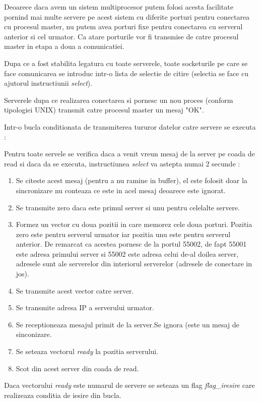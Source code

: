 Deoarece daca avem un sistem multiprocesor putem folosi acesta facilitate
pornind mai multe servere pe acest sistem cu diferite porturi pentru
conectarea cu procesul master, nu putem avea porturi fixe pentru conectarea
cu serverul anterior si cel urmator. Ca atare porturile vor fi transmise de
catre procesul master in etapa a doua a comunicatiei.

Dupa ce a fost stabilita legatura cu toate serverele, toate socketurile pe
care se face comunicarea se introduc intr-o lista de selectie de citire 
(selectia se face cu ajutorul instructiunii {\it select}).

Serverele dupa ce realizarea conectarea si pornesc un nou proces (conform
tipologiei UNIX) transmit catre procesul master un mesaj "OK".

Intr-o bucla conditionata de transmiterea tururor datelor catre servere se
executa :

Pentru toate servele se verifica daca a venit vreun mesaj de la server pe
coada de read si daca da se executa, instructiunea {\it select} va astepta 
numai 2 secunde :

\begin{enumerate}
\item Se citeste acest mesaj (pentru a nu ramine in buffer), el este folosit
doar la sincronizare nu conteaza ce este in acel mesaj deoarece este
ignorat.
\item Se transmite zero daca este primul server si unu pentru celelalte
servere.
\item Formez un vector cu doua pozitii in care memorez cele doua porturi.
Pozitia zero este pentru serverul urmator iar pozitia unu este pentru
serverul anterior. De remarcat ca acestea pornesc de la portul 55002, de
fapt 55001 este adresa primului server si 55002 este adresa celui de-al
doilea server, adresele sunt ale serverelor din interiorul serverelor
(adresele de conectare in jos).
\item Se transmite acest vector catre server.
\item Se transmite adresa IP a serverului urmator.
\item Se receptioneaza mesajul primit de la server.Se ignora (este un mesaj
de sinconizare.
\item Se seteaza vectorul {\it ready} la pozitia serverului.
\item Scot din acest server din coada de read.
\end{enumerate}

Daca vectorului {\it ready} este numarul de servere se seteaza un flag {\it
flag\_iresire} care realizeaza conditia de iesire din bucla.

